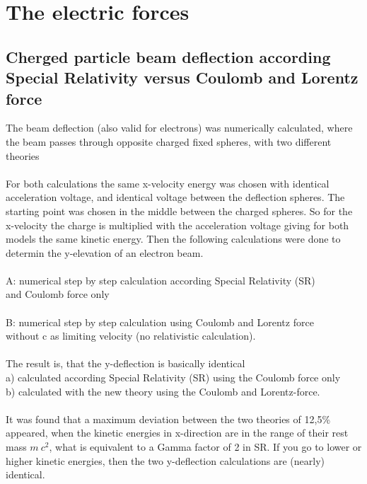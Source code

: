 \documentclass[10pt,titlepage]{article}
\begin{document}
\section{The electric forces}

        					
\subsection{Cherged particle beam deflection according \\Special Relativity versus Coulomb and Lorentz force}
The beam deflection (also valid for electrons) was numerically calculated, where the beam passes through opposite charged fixed spheres, with two different theories\\\\
For both calculations the same x-velocity energy was chosen with identical acceleration voltage, and identical voltage between the deflection spheres. The starting point was chosen in the middle between the charged spheres. So for the x-velocity the charge is multiplied with the acceleration voltage giving for both models the same kinetic energy.
Then the following calculations were done to determin the y-elevation of an electron beam.
\\\\
A: numerical step by step calculation according Special Relativity (SR)\\ and Coulomb force only
\\\\
B: numerical step by step calculation using Coulomb and Lorentz force\\ without c as limiting velocity (no relativistic calculation).
\\\\
The result is, that the y-deflection is basically identical \\a) calculated according Special Relativity (SR) using the Coulomb force only\\b) calculated with the new theory using the Coulomb and Lorentz-force.
\\\\
It was found that a maximum deviation between the two theories of 12,5\% appeared, when the kinetic energies in x-direction are in the range of their rest mass $m \ c^2$, what is equivalent to a Gamma factor of 2 in SR. If you go to lower or higher kinetic energies, then the two y-deflection calculations are (nearly) identical.
\end{document}
